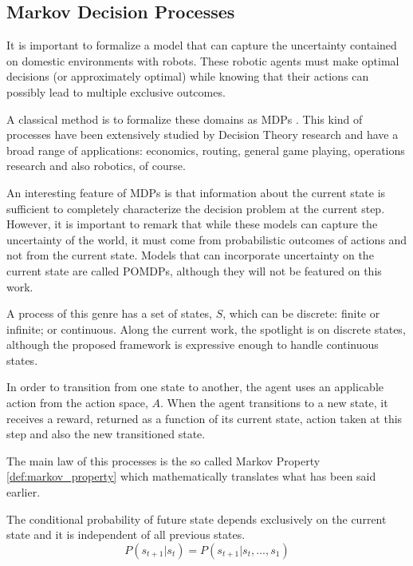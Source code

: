 \subsection{Markov Decision Processes}

It is important to formalize a model that can capture the uncertainty contained
on domestic environments with robots. These robotic agents must make optimal
decisions (or approximately optimal) while knowing that their actions can
possibly lead to multiple exclusive outcomes.

A classical method is to formalize these domains as \glspl{MDP}
\cite{Sutton1998} \cite{bertsekasneuro} \cite{russell1995modern}.
This kind of processes have been extensively studied by Decision Theory
research and have a broad range of applications: economics, routing, general
game playing, operations research and also robotics, of course.

An interesting feature of \glspl{MDP} is that information about the current
state is sufficient to completely characterize the decision problem at the current
step. However, it is important to remark that while these models can capture the
uncertainty of the world, it must come from probabilistic outcomes of actions
and not from the current state. Models that can incorporate
uncertainty on the current state are called \glspl{POMDP}, although they will
not be featured on this work.

A process of this genre has a set of states, $S$, which can be discrete: finite
or infinite; or continuous. Along the current work, the spotlight is on discrete
states, although the proposed framework is expressive enough to handle
continuous states.

In order to transition from one state to another, the agent
uses an applicable action from the action space, $A$. When the agent transitions
to a new state, it receives a reward, returned as a function of its current
state, action taken at this step and also the new transitioned state.

The main law of this processes is the so called Markov Property
\ref{def:markov_property} which mathematically translates what has been said
earlier.

\begin{property} The conditional probability of future state
depends exclusively on the current state and it is independent of all previous
states.
\label{def:markov_property}
\begin{equation}
    P(s_{t+1}|s_{t}) = P(s_{t+1}|s_{t},...,s_1)
\end{equation}
\end{property}

